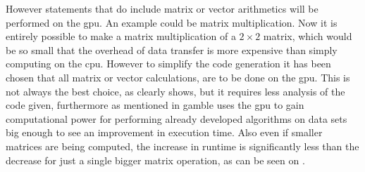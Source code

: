 However statements that do include matrix or vector arithmetics will be performed on the \acrshort{gpu}.
An example could be matrix multiplication.
Now it is entirely possible to make a matrix multiplication of a $2\times2$ matrix, which would be so small that the overhead of data transfer is more expensive than simply computing on the \acrshort{cpu}. 
However to simplify the code generation it has been chosen that all matrix or vector calculations, are to be done on the \acrshort{gpu}.
This is not always the best choice, as  clearly shows, but it requires less analysis of the code given, furthermore as mentioned in  \gls{gamble} uses the \acrshort{gpu} to gain computational power for performing already developed algorithms on data sets big enough to see an improvement in execution time.
Also even if smaller matrices are being computed, the increase in runtime is significantly less than the decrease for just a single bigger matrix operation, as can be seen on .

